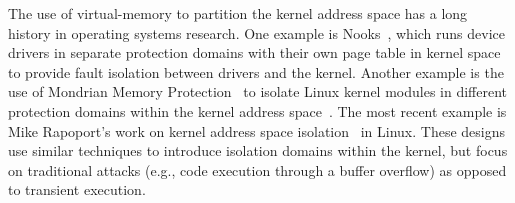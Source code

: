 The use of virtual-memory to partition the kernel address space has a
long history in operating systems research.  One example is
Nooks~\cite{swift:nooks-tocs}, which runs device drivers in separate
protection domains with their own page table in kernel space to
provide fault isolation between drivers and the kernel.  Another
example is the use of Mondrian Memory Protection~\cite{witchel:mmp} to
isolate Linux kernel modules in different protection domains within
the kernel address space~\cite{witchel:mondrix}.  The most
recent example is Mike Rapoport's work on kernel address space
isolation~\cite{lwn:beyond-kpti} in Linux.  These designs use similar
techniques to introduce isolation domains within the kernel, but focus
on traditional attacks (e.g., code execution through a buffer overflow)
as opposed to transient execution.









